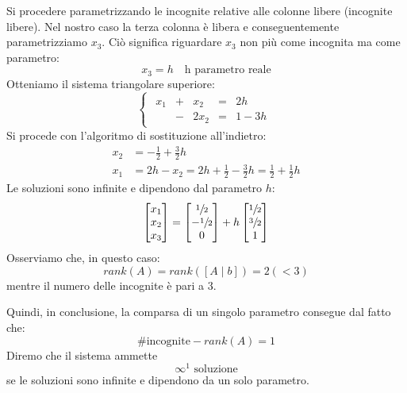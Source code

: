 \documentclass[12pt]{report}
\begin{document}
\begin{example}{}{}
Si procedere parametrizzando le incognite relative alle colonne libere (incognite libere). Nel nostro caso la terza colonna è libera e conseguentemente parametrizziamo $x_3$. Ciò significa riguardare $x_3$ non più come incognita ma come parametro:
\[
x_3 = h \quad \text{h parametro reale}
\]
Otteniamo il sistema triangolare superiore:
\[
\begin{cases}
	\begin{array}{rcrcr}
	x_1 & + & x_2 & = & 2h \\
	& - & 2x_2 & = & 1 - 3h
	\end{array}
\end{cases}
\]
Si procede con l'algoritmo di sostituzione all'indietro:
\begin{align*}
x_2 &= -\frac{1}{2} + \frac{3}{2}h \\
x_1 &= 2h - x_2 = 2h + \frac{1}{2} - \frac{3}{2}h = \frac{1}{2} + \frac{1}{2}h
\end{align*}
Le soluzioni sono infinite e dipendono dal parametro $h$:
\[
\begin{bmatrix}
	x_1 \\
	x_2 \\
	x_3
\end{bmatrix} = \begin{bmatrix}
	\sfrac{1}{2} \\
	-\sfrac{1}{2} \\
	0
\end{bmatrix} + h \begin{bmatrix}
	\sfrac{1}{2} \\
	\sfrac{3}{2} \\
	1
\end{bmatrix}
\]
Osserviamo che, in questo caso:
\[
rank(A) = rank([A \mid b]) = 2 (< 3)
\]
mentre il numero delle incognite è pari a 3.

Quindi, in conclusione, la comparsa di un singolo parametro consegue dal fatto che:
\[
\#\text{incognite} - rank(A) = 1
\]
Diremo che il sistema ammette
\[
\infty^1 \text{ soluzione}
\]
se le soluzioni sono infinite e dipendono da un solo parametro.
\end{example}
\end{document}
